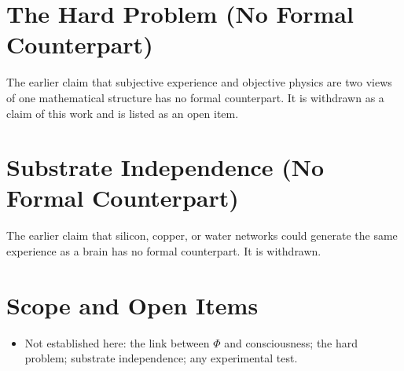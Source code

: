 \documentclass[11pt, a4paper]{article}
\begin{document}
\section{The Hard Problem (No Formal Counterpart)}
The earlier claim that subjective experience and objective physics are two views of one mathematical structure has no formal counterpart. It is withdrawn as a claim of this work and is listed as an open item.

\section{Substrate Independence (No Formal Counterpart)}
The earlier claim that silicon, copper, or water networks could generate the same experience as a brain has no formal counterpart. It is withdrawn.

\section{Scope and Open Items}
\begin{itemize}
  \item Not established here: the link between $\Phi$ and consciousness; the hard problem; substrate independence; any experimental test.
\end{itemize}
\end{document}
